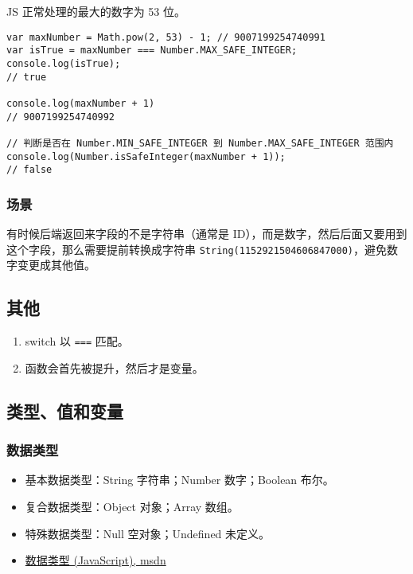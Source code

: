 JS 正常处理的最大的数字为 53 位。

\begin{lstlisting}
var maxNumber = Math.pow(2, 53) - 1; // 9007199254740991
var isTrue = maxNumber === Number.MAX_SAFE_INTEGER;
console.log(isTrue);
// true

console.log(maxNumber + 1)
// 9007199254740992

// 判断是否在 Number.MIN_SAFE_INTEGER 到 Number.MAX_SAFE_INTEGER 范围内
console.log(Number.isSafeInteger(maxNumber + 1));
// false
\end{lstlisting}

\subsubsection{场景}\label{ux573aux666f}

有时候后端返回来字段的不是字符串（通常是
ID），而是数字，然后后面又要用到这个字段，那么需要提前转换成字符串
\lstinline!String(1152921504606847000)!，避免数字变更成其他值。

\subsection{其他}\label{ux5176ux4ed6}

\begin{enumerate}
\def\labelenumi{\arabic{enumi}.}
\tightlist
\item
  switch 以 \lstinline!===! 匹配。
\item
  函数会首先被提升，然后才是变量。
\end{enumerate}

\subsection{类型、值和变量}\label{ux7c7bux578bux503cux548cux53d8ux91cf}

\subsubsection{数据类型}\label{ux6570ux636eux7c7bux578b}

\begin{itemize}
\item
  基本数据类型：String 字符串；Number 数字；Boolean 布尔。
\item
  复合数据类型：Object 对象；Array 数组。
\item
  特殊数据类型：Null 空对象；Undefined 未定义。
\item
  \href{https://msdn.microsoft.com/zh-cn/library/7wkd9z69(v=vs.94).aspx}{数据类型
  (JavaScript), msdn}
\end{itemize}

